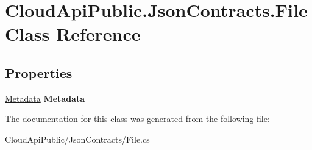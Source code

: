 \hypertarget{class_cloud_api_public_1_1_json_contracts_1_1_file}{\section{Cloud\-Api\-Public.\-Json\-Contracts.\-File Class Reference}
\label{class_cloud_api_public_1_1_json_contracts_1_1_file}
}
\subsection*{Properties}
\begin{DoxyCompactItemize}
\item 
\hypertarget{class_cloud_api_public_1_1_json_contracts_1_1_file_ac69ebbbf34785fbcdc525a5f2eae5fd2}{\hyperlink{class_cloud_api_public_1_1_json_contracts_1_1_metadata}{Metadata} {\bfseries Metadata}}\label{class_cloud_api_public_1_1_json_contracts_1_1_file_ac69ebbbf34785fbcdc525a5f2eae5fd2}

\end{DoxyCompactItemize}


The documentation for this class was generated from the following file\-:\begin{DoxyCompactItemize}
\item 
Cloud\-Api\-Public/\-Json\-Contracts/File.\-cs\end{DoxyCompactItemize}
